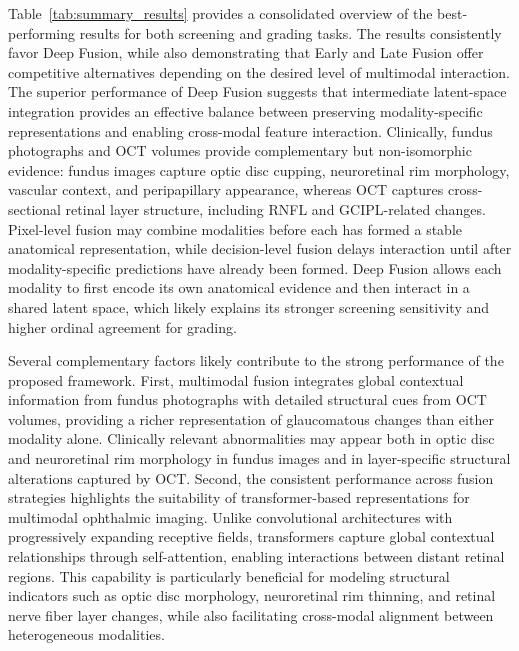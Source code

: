 \documentclass[preprint,12pt]{elsarticle}
\begin{document}
Table~\ref{tab:summary_results} provides a consolidated overview of the best-performing results for both screening and grading tasks. The results consistently favor Deep Fusion, while also demonstrating that Early and Late Fusion offer competitive alternatives depending on the desired level of multimodal interaction. The superior performance of Deep Fusion suggests that intermediate latent-space integration provides an effective balance between preserving modality-specific representations and enabling cross-modal feature interaction.
Clinically, fundus photographs and OCT volumes provide complementary but non-isomorphic evidence: fundus images capture optic disc cupping, neuroretinal rim morphology, vascular context, and peripapillary appearance, whereas OCT captures cross-sectional retinal layer structure, including RNFL and GCIPL-related changes. Pixel-level fusion may combine modalities before each has formed a stable anatomical representation, while decision-level fusion delays interaction until after modality-specific predictions have already been formed. Deep Fusion allows each modality to first encode its own anatomical evidence and then interact in a shared latent space, which likely explains its stronger screening sensitivity and higher ordinal agreement for grading.

Several complementary factors likely contribute to the strong performance of the proposed framework. First, multimodal fusion integrates global contextual information from fundus photographs with detailed structural cues from OCT volumes, providing a richer representation of glaucomatous changes than either modality alone. Clinically relevant abnormalities may appear both in optic disc and neuroretinal rim morphology in fundus images and in layer-specific structural alterations captured by OCT. Second, the consistent performance across fusion strategies highlights the suitability of transformer-based representations for multimodal ophthalmic imaging. Unlike convolutional architectures with progressively expanding receptive fields, transformers capture global contextual relationships through self-attention, enabling interactions between distant retinal regions. This capability is particularly beneficial for modeling structural indicators such as optic disc morphology, neuroretinal rim thinning, and retinal nerve fiber layer changes, while also facilitating cross-modal alignment between heterogeneous modalities.
\end{document}
